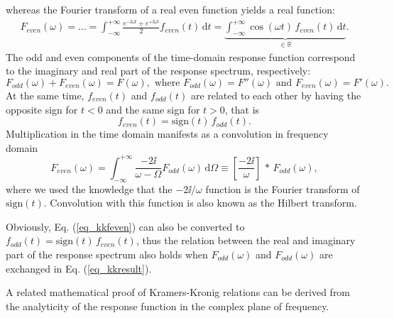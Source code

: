 whereas the Fourier transform of a real even function yields a real function:
\begin{equation} 
\begin{split} 
F_{even}(\omega)= \ldots =   \int_{-\infty}^{+\infty} \frac{e^{-\ii \omega t}+e^{+\ii \omega t}}{2} f_{even}(t) \,\mbox{d}t 
		 = \underbrace{\int_{-\infty}^{+\infty} \cos(\omega t) \, f_{even}(t) \,\mbox{d}t}_{\mbox{$\in \mathbb{R}$}}.
\end{split} 
\label{eq_kkFeven}\end{equation}
The odd and even components of the time-domain response function correspond to the imaginary and real part of the response spectrum, respectively:
\begin{equation} F_{odd}(\omega) + F_{even}(\omega) = F(\omega), \text{ where } F_{odd}(\omega) = F''(\omega) \text{ and } F_{even}(\omega) = F'(\omega).  \label{eq_kkFodd}\end{equation}
At the same time, $f_{even}(t)$ and $f_{odd}(t)$ are related to each other by having the opposite sign for $t<0$ and the same sign for $t>0$, that is 
\begin{equation} f_{even}(t) = \mbox{sign}(t)\,f_{odd}(t). \label{eq_kkfeven}\end{equation}
Multiplication in the time domain manifests as a convolution in frequency domain
\begin{equation} 
F_{even}(\omega) = \int_{-\infty}^{+\infty}  \frac{-2\ii}{\omega - \Omega} F_{odd}(\omega) \,\mbox{d}\Omega  \equiv  \left[\frac{-2\ii}{\omega}\right]\,\ast\,F_{odd}(\omega),
\label{eq_kkresult}\end{equation} 
where we used the knowledge that the $-2\ii/\omega$ function is the Fourier transform of $\mbox{sign}(t)$. Convolution with this function is also known as the Hilbert transform.%

Obviously, Eq. (\ref{eq_kkfeven}) can also be converted to $f_{odd}(t) = \mbox{sign}(t)\,f_{even}(t)$, thus the relation between the real and imaginary part of the response spectrum also holds when $F_{odd}(\omega)$ and $F_{odd}(\omega)$ are exchanged in Eq. (\ref{eq_kkresult}). 

A related mathematical proof of Kramers-Kronig relations can be derived from the analyticity of the response function in the complex plane of frequency. %


